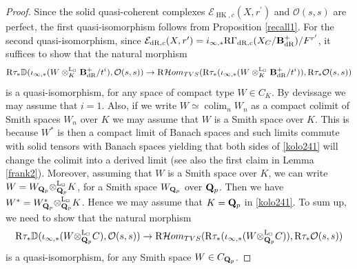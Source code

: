 \documentclass[10pt,reqno]{amsart}
\let\cal\mathcal
\theoremstyle{definition}
\theoremstyle{remark}
\newcommand{\dr}{\operatorname{dR} }
\newcommand{\colim}{\operatorname{colim} }
\newcommand{\Hhom}{{\cal Hom}}
\newcommand{\hk}{\operatorname{HK} }
\newcommand{\LL}{\operatorname{L} }
\newcommand{\so}{{\mathcal O}}
\newcommand{\se}{{\mathcal{E}}}
\numberwithin{equation}{section}
\def\R{{\mathrm R}}
\def\Q{{\bf Q}} \def\Z{{\bf Z}}
\numberwithin{equation}{section}
\begin{document}
\begin{proof}
  Since the solid quasi-coherent complexes $\se_{\hk,c}(X,r^{\prime})$ and $\so(s,s)$ are perfect, the first quasi-isomorphism follows from Proposition \ref{recall1}. 
For the second quasi-isomorphism, since $\se_{\dr,c}(X,r^{\prime})=i_{\infty,*}\R\Gamma_{\dr,c}(X_C/\B_{\dr}^+)/F^{r^{\prime}}$, it suffices to show that the natural morphism
  \begin{equation}\label{kolo241}
    \R\tau_{*} {\mathbb D}(\iota_{\infty,*}(W\otimes^{\LL_{\Box}}_{K}\B^+_{\dr}/t^i),\so(s,s))\to\R\Hhom_{\rm TVS}(\R\tau_{*}(\iota_{\infty,*}(W\otimes^{\LL_{\Box}}_{K}\B^+_{\dr}/t^i)),\R\tau_{*}\so(s,s))
  \end{equation}
  is a quasi-isomorphism, for  any  space of compact type $W\in C_K$. By devissage we may assume that $i=1$.  
Also, if we write  $W\simeq \colim_n W_n$ as a compact colimit of Smith spaces $W_n$ over $K$ we may assume that $W$ is a Smith space over $K$.  This is because 
$W^*$ is then a compact limit of Banach spaces and such limits commute with solid tensors with Banach spaces yielding that both sides of \eqref{kolo241} will change the colimit into a derived limit (see also the first claim in Lemma \ref{frank2}).  
Moreover, assuming that $W$ is a Smith space over $K$, we can write $W=W_{\Q_p}{\otimes^{\LL_{\Box}}_{\Q_{p}}}K$, 
for a Smith space $W_{\Q_p}$ over $\Q_p$. 
Then we have $W^*=W^*_{\Q_p}{\otimes^{\LL_{\Box}}_{\Q_{p}}}K$. 
 Hence we may assume that $K=\Q_p$ in \eqref{kolo241}. To sum up, we need to show that  the natural morphism
  \begin{equation}\label{kolo241a}
    \R\tau_{*} {\mathbb D}(\iota_{\infty,*}(W{\otimes^{\LL_{\Box}}_{\Q_{p}}}C),\so(s,s))\to\R\Hhom_{\rm TVS}(\R\tau_{*}(\iota_{\infty,*}(W{\otimes^{\LL_{\Box}}_{\Q_{p}}}C)),\R\tau_{*}\so(s,s))
  \end{equation}
  is a quasi-isomorphism, for  any  Smith space $W\in C_{\Q_p}$.


\end{proof}
\end{document}
